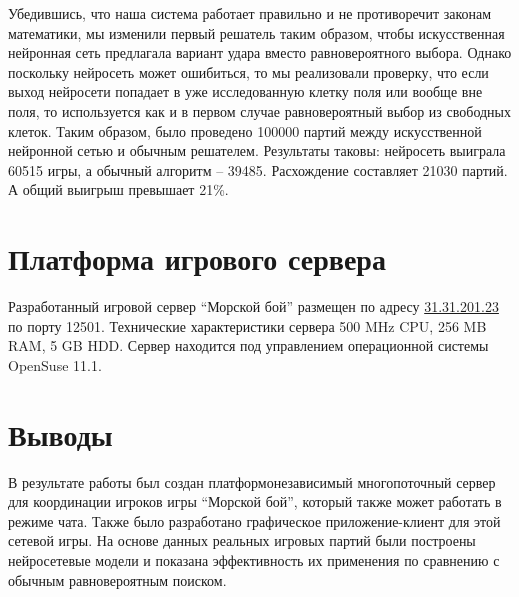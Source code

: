 \documentclass[12pt, a4paper, oneside]{article}
\begin{document}
Убедившись, что наша система работает правильно и не противоречит законам математики, мы изменили первый решатель таким образом, чтобы искусственная нейронная сеть предлагала вариант удара вместо равновероятного выбора. Однако поскольку нейросеть может ошибиться, то мы реализовали проверку, что если выход нейросети попадает в уже исследованную клетку поля или вообще вне поля, то используется как и в первом случае равновероятный выбор из свободных клеток. Таким образом, было проведено 100000 партий между искусственной нейронной сетью и обычным решателем. Результаты таковы: нейросеть выиграла 60515 игры, а обычный алгоритм – 39485. Расхождение составляет 21030 партий. А общий выигрыш превышает 21\%. 

\section{Платформа игрового сервера}

Разработанный игровой сервер ``Морской бой'' размещен по адресу \url{31.31.201.23} по порту 12501. Технические характеристики сервера 500 MHz CPU, 256 MB RAM, 5 GB HDD. Сервер находится под управлением операционной системы OpenSuse 11.1.
\newpage

\section*{Выводы}

В результате работы был создан платформонезависимый многопоточный сервер для координации игроков игры ``Морской бой'', который также может работать в режиме чата. Также было разработано графическое приложение-клиент для этой сетевой игры. На основе данных реальных игровых партий были построены нейросетевые модели и показана эффективность их применения по сравнению с обычным равновероятным поиском.

\nocite{maks}
\nocite{zemskov}
\nocite{Callan}
\nocite{backprop}
\nocite{Haykin}

\newpage


\end{document}
